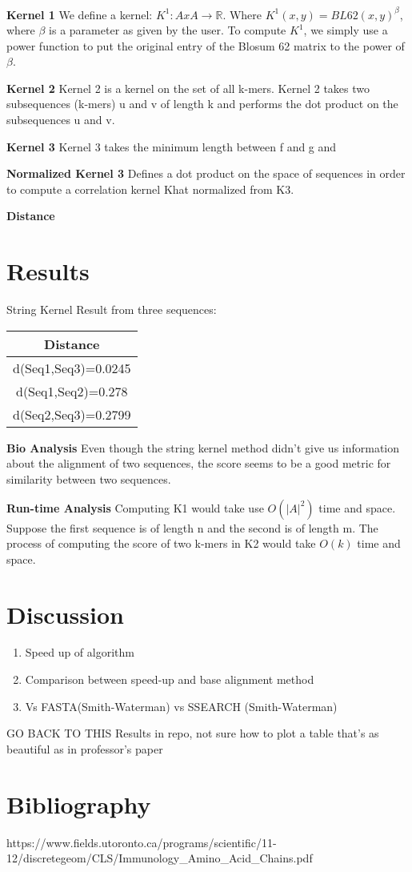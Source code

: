\documentclass{article}
\begin{document}
\textbf{Kernel 1}
We define a kernel: $K^1 \colon A x A \to \mathbb{R}$. Where $K^1(x, y) = BL62(x, y)^β$, where $\beta$ is a parameter as given by the user. To compute $K^1$, we simply use a power function to put the original entry of the Blosum 62 matrix to the power of $\beta$. 

\textbf{Kernel 2}
Kernel 2 is a kernel on the set of all k-mers. Kernel 2 takes two subsequences (k-mers) u and v of length k and performs the dot product on the subsequences u and v.

\textbf{Kernel 3}
Kernel 3 takes the minimum length between f and g and

\textbf{Normalized Kernel 3}
Defines a dot product on the space of sequences in order to compute a correlation kernel Khat normalized from K3. 

\textbf{Distance}


\section{Results}
String Kernel Result from three sequences:
\begin{center}
\begin{tabular}{ |c|} \hline
Distance            \\ \hline
d(Seq1,Seq3)=0.0245 \\ \hline
d(Seq1,Seq2)=0.278  \\ \hline
d(Seq2,Seq3)=0.2799 \\ \hline
\end{tabular}
\end{center}

\par
\textbf{Bio Analysis}
Even though the string kernel method didn’t give us information about the alignment of two sequences, the score seems to be a good metric for similarity between two sequences.

\textbf{Run-time Analysis}
Computing K1 would take use $O(|A|^2)$ time and space. Suppose the first sequence is of length n and the second is of length m. The process of computing the score of two k-mers in K2 would take $O(k)$ time and space. 

\section{Discussion}
\begin{enumerate}
    \item Speed up of algorithm
    \item Comparison between speed-up and base alignment method
    \item Vs FASTA(Smith-Waterman) vs SSEARCH (Smith-Waterman)
\end{enumerate}
GO BACK TO THIS
Results in repo, not sure how to plot a table that’s as beautiful as in professor’s paper


\section{Bibliography}
https://www.fields.utoronto.ca/programs/scientific/11-12/discretegeom/CLS/Immunology_Amino_Acid_Chains.pdf
\end{document}
